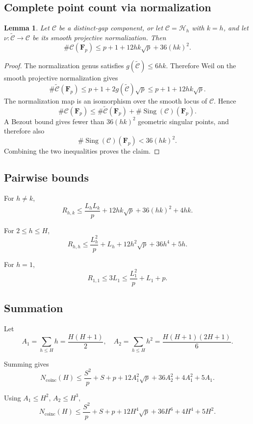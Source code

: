 \documentclass[11pt]{article}
\newtheorem{lemma}[theorem]{Lemma}
\theoremstyle{remark}
\newcommand{\Fp}{\mathbf F_p}
\newcommand{\Ncoinc}{N_{\mathrm{coinc}}}
\begin{document}
\subsection*{Complete point count via normalization}

\begin{lemma}
Let $\mathcal C$ be a distinct-gap component, or let
$\mathcal C=\mathcal H_h$ with $k=h$, and let
$\nu:\widetilde{\mathcal C}\to\mathcal C$ be its smooth projective
normalization.  Then
\[
\#\mathcal C(\Fp)
\le p + 1 + 12hk \sqrt{p} + 36 (hk)^2.
\]
\end{lemma}

\begin{proof}
The normalization genus satisfies $g(\widetilde{\mathcal C})\le6hk$.
Therefore Weil on the smooth projective normalization gives
\[
\#\widetilde{\mathcal C}(\Fp)
\le p+1+2g(\widetilde{\mathcal C})\sqrt p
\le p+1+12hk\sqrt p.
\]
The normalization map is an isomorphism over the smooth locus of
$\mathcal C$.  Hence
\[
\#\mathcal C(\Fp)
\le \#\widetilde{\mathcal C}(\Fp)
   +\#\operatorname{Sing}(\mathcal C)(\Fp).
\]
A Bezout bound gives fewer than $36(hk)^2$ geometric singular points, and
therefore also
\[
\#\operatorname{Sing}(\mathcal C)(\Fp)<36(hk)^2.
\]
Combining the two inequalities proves the claim.
\end{proof}

\subsection*{Pairwise bounds}

For $h \ne k$,
\[
R_{h,k}
\le \frac{L_h L_k}{p}
+ 12hk \sqrt p
+ 36 (hk)^2
+ 4hk.
\]

For $2 \le h \le H$,
\[
R_{h,h}
\le \frac{L_h^2}{p}
+ L_h
+ 12h^2 \sqrt p
+ 36 h^4
+ 5h.
\]

For $h=1$,
\[
R_{1,1} \le 3 L_1 \le \frac{L_1^2}{p} + L_1 + p.
\]

\subsection*{Summation}

Let
\[
A_1 = \sum_{h\le H} h = \frac{H(H+1)}{2},
\quad
A_2 = \sum_{h\le H} h^2 = \frac{H(H+1)(2H+1)}{6}.
\]

Summing gives
\[
\Ncoinc(H)
\le \frac{S^2}{p} + S + p
+ 12 A_1^2 \sqrt p
+ 36 A_2^2
+ 4 A_1^2
+ 5 A_1.
\]

Using $A_1 \le H^2$, $A_2 \le H^3$,
\[
\Ncoinc(H)
\le \frac{S^2}{p} + S + p
+ 12 H^4 \sqrt p
+ 36 H^6
+ 4 H^4
+ 5 H^2.
\]
\end{document}
